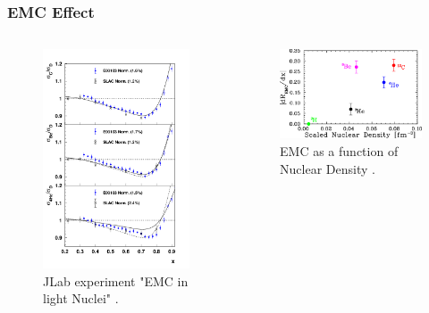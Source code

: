 \documentclass{beamer}
\begin{document}
\begin{frame}
\frametitle{EMC Effect}
\begin{columns}[]

	\vspace{-15pt}
\begin{figure}
	\caption{\label{E03103} JLab experiment "EMC in light Nuclei" \cite{E3103}.}
	\vspace{-20pt}
	\includegraphics[width =5cm]{../images/carbon_be_he4}
\end{figure}

	\hspace{10pt}
\begin{figure}

	\caption{\label{E03103_1} EMC as a function of Nuclear Density \cite{E3103}.}

	\includegraphics[width =6cm]{../images/PRL_slopes}
\end{figure}
\end{columns}
\end{frame}
\end{document}
